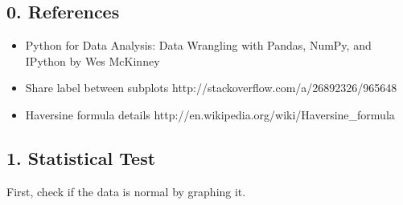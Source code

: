 \documentclass{article}
\begin{document}
    \subsection*{0. References}\label{references}

    \begin{itemize}
\itemsep1pt\parskip0pt
\item
  Python for Data Analysis: Data Wrangling with Pandas, NumPy, and
  IPython by Wes McKinney
\item
  Share label between subplots
  http://stackoverflow.com/a/26892326/965648
\item
  Haversine formula details
  http://en.wikipedia.org/wiki/Haversine\_formula
\end{itemize}

    \subsection*{1. Statistical Test}\label{statistical-test}

    First, check if the data is normal by graphing it.
\end{document}
